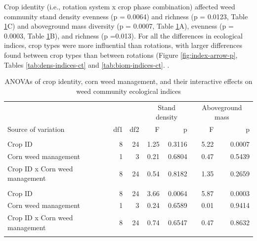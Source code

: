 \documentclass[
]{article}
\begin{document}
Crop identity (i.e., rotation system x crop phase combination) affected weed community stand density evenness (p = 0.0064) and richness (p = 0.0123, Table \ref{tab:all-index-jt}C) and aboveground mass diversity (p = 0.0007, Table \ref{tab:all-index-jt}A), evenness (p = 0.0003, Table \ref{tab:all-index-jt}B), and richness (p =0.013). For all the differences in ecological indices, crop types were more influential than rotations, with larger differences found between crop types than between rotations (Figure \ref{fig:index-arrow-p}, Tables \ref{tab:dens-indices-ct} and \ref{tab:biom-indices-ct}. .

\begin{table}

\caption{\label{tab:all-index-jt}ANOVAs of crop identity, corn weed management, and their interactive effects on weed community ecological indices}
\centering
\begin{threeparttable}
\begin{tabular}[t]{lrrr>{}r|rr}
\toprule
\multicolumn{3}{c}{ } & \multicolumn{2}{c}{Stand density} & \multicolumn{2}{c}{Aboveground mass} \\
\cmidrule(l{3pt}r{3pt}){4-5} \cmidrule(l{3pt}r{3pt}){6-7}
Source of variation & df1 & df2 & F & p & F & p\\
\midrule
\addlinespace[0.3em]
\multicolumn{7}{l}{\textbf{(A) - Community diversity}}\\
\hspace{1em}Crop ID & 8 & 24 & 1.25 & 0.3116 & 5.22 & 0.0007\\
\hspace{1em}Corn weed management & 1 & 3 & 0.21 & 0.6804 & 0.47 & 0.5439\\
\hspace{1em}Crop ID x Corn weed management & 8 & 24 & 0.54 & 0.8182 & 1.35 & 0.2659\\
\addlinespace[0.3em]
\multicolumn{7}{l}{\textbf{(B) - Community evenness}}\\
\hspace{1em}Crop ID & 8 & 24 & 3.66 & 0.0064 & 5.87 & 0.0003\\
\hspace{1em}Corn weed management & 1 & 3 & 0.24 & 0.6589 & 0.01 & 0.9414\\
\hspace{1em}Crop ID x Corn weed management & 8 & 24 & 0.74 & 0.6547 & 0.47 & 0.8632\\
\addlinespace[0.3em]
\multicolumn{7}{l}{\textbf{(C) - Community richness}}\\

\end{tabular}
\end{threeparttable}
\end{table}
\end{document}

